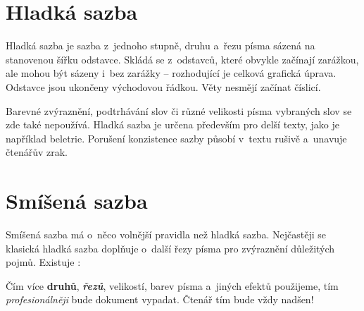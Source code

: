 \documentclass[a4paper, 11pt, twocolumn]{article}
\begin{document}

	\section{Hladká sazba}

	Hladká sazba je sazba z~jednoho stupně, druhu a~řezu písma sázená na stanovenou šířku odstavce. Skládá se z~odstavců,
	které obvykle začínají zarážkou, ale mohou být sázeny i~bez zarážky -- rozhodující je celková grafická úprava. Odstavce
	jsou ukončeny východovou řádkou. Věty nesmějí začínat číslicí.

	Barevné zvýraznění, podtrhávání slov či různé velikosti písma vybraných slov se zde také nepoužívá. Hladká sazba je určena
	především pro delší texty, jako je například beletrie. Porušení konzistence sazby působí v~textu rušivě a~unavuje čtenářův zrak.

	\section{Smíšená sazba}

	Smíšená sazba má o~něco volnější pravidla než hladká sazba. Nejčastěji se klasická hladká sazba doplňuje o~další řezy písma
	pro zvýraznění důležitých pojmů. Existuje :

	\begin{adjustwidth}{0.77cm}{0.80cm}
		\medskip
		\setlength{\parindent}{0.5cm}
		\hspace{\parindent}
		Čím více \textbf{druhů}, \textbf{\emph{řezů}}, {\scriptsize velikostí}, barev pí\-sma a~jiných efektů použijeme, tím \emph{profesionálněji}
		bude dokument vypadat. Čtenář tím bude vždy {\Huge nadšen!}
		\medskip
	\end{adjustwidth}
\end{document}
